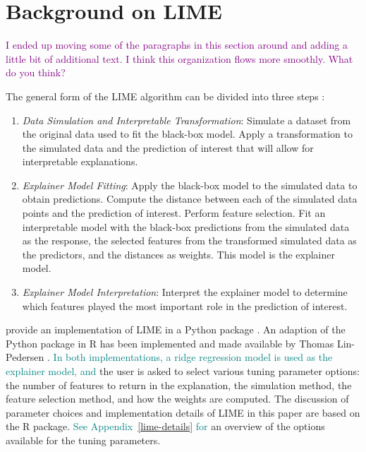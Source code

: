 \documentclass[AMS,STIX2COL]{WileyNJD-v2}\usepackage[]{graphicx}\usepackage[]{color}
\newcommand{\kgc}[1]{\textcolor{purple}{#1}}
\newcommand{\kge}[1]{\textcolor{teal}{#1}}
\renewcommand{\sout}[1]{\unskip}
\begin{document}
\section{Background on LIME} \label{background}

\kgc{I ended up moving some of the paragraphs in this section around and adding a little bit of additional text. I think this organization flows more smoothly. What do you think?}

The general form of the LIME algorithm can be divided into three steps \citep[see also][]{laugel:2018}:

\begin{enumerate}

\item \emph{Data Simulation and Interpretable Transformation}: Simulate a dataset from the original data used to fit the black-box model. Apply a transformation to the simulated data and the prediction of interest that will allow for interpretable explanations.

\item \emph{Explainer Model Fitting}: Apply the black-box model to the simulated data to obtain predictions. Compute the distance between each of the simulated data points and the prediction of interest. Perform feature selection. Fit an interpretable model with the black-box predictions from the simulated data as the response, the selected features from the transformed simulated data as the predictors, and the distances as weights. This model is the explainer model.

\item \emph{Explainer Model Interpretation}: Interpret the explainer model to determine which features played the most important role in the prediction of interest.

\end{enumerate}

\citet{ribeiro:2016} provide an implementation of LIME in a Python package \cite{ribeiro:2020}. An adaption of the Python package in R has been implemented and made available by Thomas Lin-Pedersen \citep{pedersen:2020}. \kge{In both implementations, a ridge regression model is used as the explainer model, and} \sout{During the application of LIME, t} the user is asked to select various tuning parameter options: the number of features to return in the explanation, the simulation method, the feature selection method, and how the weights are computed. The discussion of parameter choices and implementation details of LIME in this paper are based on the R package. \kge{See Appendix~\ref{lime-details} for}
an overview of the options available for the tuning parameters\sout{ is included in Appendix~\ref{lime-details}}.
\end{document}
